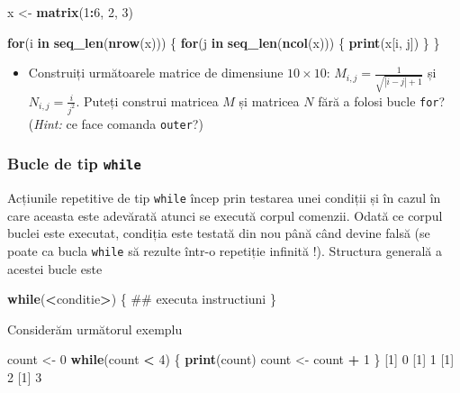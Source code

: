 \documentclass[]{article}
\newenvironment{Shaded}{\begin{snugshade}}{\end{snugshade}}
\newcommand{\KeywordTok}[1]{\textcolor[rgb]{0.13,0.29,0.53}{\textbf{#1}}}
\newcommand{\DecValTok}[1]{\textcolor[rgb]{0.00,0.00,0.81}{#1}}
\newcommand{\StringTok}[1]{\textcolor[rgb]{0.31,0.60,0.02}{#1}}
\newcommand{\ControlFlowTok}[1]{\textcolor[rgb]{0.13,0.29,0.53}{\textbf{#1}}}
\newcommand{\OperatorTok}[1]{\textcolor[rgb]{0.81,0.36,0.00}{\textbf{#1}}}
\newcommand{\NormalTok}[1]{#1}
\newenvironment{frshaded*}{%
  \def\FrameCommand{\fboxrule=\FrameRule\fboxsep=\FrameSep \fcolorbox{framecolor}{shadecolor1}}%
  \MakeFramed {\advance\hsize-\width \FrameRestore}}%
{\endMakeFramed}
\newenvironment{rmdblock}[1]
  {\begin{frshaded*}
  \begin{itemize}
  \renewcommand{\labelitemi}{
    \raisebox{-.7\height}[0pt][0pt]{
      {\setkeys{Gin}{width=2em,keepaspectratio}\texttt{[image: images/icons/\#1]}}
    }
  }
  \item
  }
  {
  \end{itemize}
  \end{frshaded*}
  }
\newcounter{exo}[section]
\newenvironment{rmdexercise}
  {\begin{rmdblock}{exercise}}
  {\end{rmdblock}}
\begin{document}
\begin{Shaded}
\begin{Highlighting}[]
\NormalTok{x <-}\StringTok{ }\KeywordTok{matrix}\NormalTok{(}\DecValTok{1}\OperatorTok{:}\DecValTok{6}\NormalTok{, }\DecValTok{2}\NormalTok{, }\DecValTok{3}\NormalTok{)}

\ControlFlowTok{for}\NormalTok{(i }\ControlFlowTok{in} \KeywordTok{seq_len}\NormalTok{(}\KeywordTok{nrow}\NormalTok{(x))) \{}
        \ControlFlowTok{for}\NormalTok{(j }\ControlFlowTok{in} \KeywordTok{seq_len}\NormalTok{(}\KeywordTok{ncol}\NormalTok{(x))) \{}
                \KeywordTok{print}\NormalTok{(x[i, j])}
\NormalTok{        \}   }
\NormalTok{\}}
\end{Highlighting}
\end{Shaded}

\begin{rmdexercise}
Construiți următoarele matrice de dimensiune \(10 \times 10\):
\(M_{i,j} = \frac{1}{\sqrt{|i-j|+1}}\) și \(N_{i,j} = \frac{i}{j^2}\).
Puteți construi matricea \(M\) și matricea \(N\) fără a folosi bucle
\texttt{for}? (\emph{Hint:} ce face comanda \texttt{outer}?)
\end{rmdexercise}

\subsubsection{\texorpdfstring{Bucle de tip
\texttt{while}}{Bucle de tip while}}\label{bucle-de-tip-while}

Acțiunile repetitive de tip \texttt{while} încep prin testarea unei
condiții și în cazul în care aceasta este adevărată atunci se execută
corpul comenzii. Odată ce corpul buclei este executat, condiția este
testată din nou până când devine falsă (se poate ca bucla \texttt{while}
să rezulte într-o repetiție infinită !). Structura generală a acestei
bucle este

\begin{Shaded}
\begin{Highlighting}[]
\ControlFlowTok{while}\NormalTok{(}\OperatorTok{<}\NormalTok{conditie}\OperatorTok{>}\NormalTok{) \{}
\NormalTok{        ## executa instructiuni}
\NormalTok{\} }
\end{Highlighting}
\end{Shaded}

Considerăm următorul exemplu

\begin{Shaded}
\begin{Highlighting}[]
\NormalTok{count <-}\StringTok{ }\DecValTok{0}
\ControlFlowTok{while}\NormalTok{(count }\OperatorTok{<}\StringTok{ }\DecValTok{4}\NormalTok{) \{}
        \KeywordTok{print}\NormalTok{(count)}
\NormalTok{        count <-}\StringTok{ }\NormalTok{count }\OperatorTok{+}\StringTok{ }\DecValTok{1}
\NormalTok{\}}
\NormalTok{[}\DecValTok{1}\NormalTok{] }\DecValTok{0}
\NormalTok{[}\DecValTok{1}\NormalTok{] }\DecValTok{1}
\NormalTok{[}\DecValTok{1}\NormalTok{] }\DecValTok{2}
\NormalTok{[}\DecValTok{1}\NormalTok{] }\DecValTok{3}
\end{Highlighting}
\end{Shaded}
\end{document}
